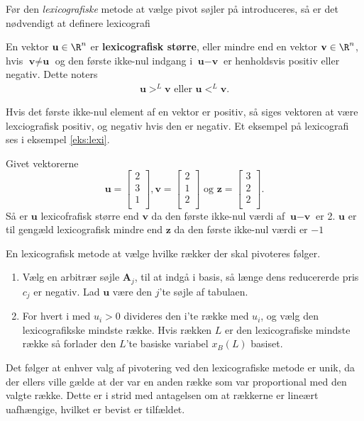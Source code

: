 Før den \textit{lexicografiske} metode at vælge pivot søjler på introduceres, så er det nødvendigt at definere lexicografi
\begin{defn}{}{}
En vektor $\textbf{u}\in \R^n$ er \textbf{lexicografisk større}, eller mindre end en vektor $\textbf{v}\in \R^n$, hvis $\textbf{v} \neq \textbf{u}$ og den første ikke-nul indgang i $\textbf{u}-\textbf{v}$ er henholdsvis positiv eller negativ. Dette noters
\begin{align*}
\textbf{u} >^L \textbf{v} \text{ eller } \textbf{u} <^L \textbf{v}.
\end{align*} 
\end{defn}
\noindent
Hvis det første ikke-nul element af en vektor er positiv, så siges vektoren at være lexciografisk positiv, og negativ hvis den er negativ. Et eksempel på lexicografi ses i eksempel \ref{eks:lexi}.
\\
%
\begin{eks}\label{eks:lexi}
Givet vektorerne
$$\textbf{u}=
\begin{bmatrix}
2\\
3\\
1\\
\end{bmatrix}
,
\textbf{v}=
\begin{bmatrix}
2\\
1\\
2\\
\end{bmatrix}
\text{ og }
\textbf{z}=
\begin{bmatrix}
3\\
2\\
2\\
\end{bmatrix}
.$$
Så er $\textbf{u}$ lexicofrafisk større end $\textbf{v}$ da den første ikke-nul værdi af $\textbf{u}-\textbf{v}$ er 2.
$\textbf{u}$ er til gengæld lexicografisk mindre end $\textbf{z}$ da den første ikke-nul værdi er $-1$
\end{eks}
En lexicografisk metode at vælge hvilke rækker der skal pivoteres følger.
\begin{enumerate}
\item Vælg en arbitrær søjle $\textbf{A}_j$, til at indgå i basis, så længe dens reducererde pris $c_j$ er negativ.
Lad $\textbf{u}$ være den $j$'te søjle af tabulaen.
\item For hvert i med $u_i>0$ divideres den i'te række med $u_i$, og vælg den lexicografikske mindste række. Hvis rækken $L$ er den lexicografiske mindste række så forlader den $L$'te basiske variabel $x_B(L)$ basiset.
\end{enumerate}
Det følger at enhver valg af pivotering ved den lexicografiske metode er unik, da der ellers ville gælde at der var en anden række som var proportional med den valgte række. Dette er i strid med antagelsen om at rækkerne er lineært uafhængige, hvilket er bevist er tilfældet.

